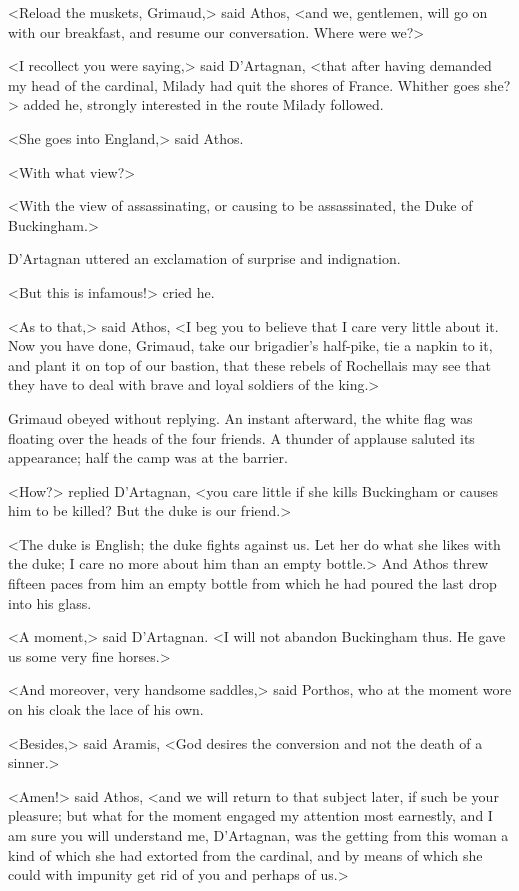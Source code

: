 <Reload the muskets, Grimaud,> said Athos, <and we, gentlemen, will go on with our breakfast, and resume our conversation. Where were we?> 

<I recollect you were saying,> said D'Artagnan, <that after having demanded my head of the cardinal, Milady had quit the shores of France. Whither goes she?> added he, strongly interested in the route Milady followed. 

<She goes into England,> said Athos. 

<With what view?> 

<With the view of assassinating, or causing to be assassinated, the Duke of Buckingham.> 

D'Artagnan uttered an exclamation of surprise and indignation. 

<But this is infamous!> cried he. 

<As to that,> said Athos, <I beg you to believe that I care very little about it. Now you have done, Grimaud, take our brigadier's half-pike, tie a napkin to it, and plant it on top of our bastion, that these rebels of Rochellais may see that they have to deal with brave and loyal soldiers of the king.> 

Grimaud obeyed without replying. An instant afterward, the white flag was floating over the heads of the four friends. A thunder of applause saluted its appearance; half the camp was at the barrier. 

<How?> replied D'Artagnan, <you care little if she kills Buckingham or causes him to be killed? But the duke is our friend.> 

<The duke is English; the duke fights against us. Let her do what she likes with the duke; I care no more about him than an empty bottle.> And Athos threw fifteen paces from him an empty bottle from which he had poured the last drop into his glass. 

<A moment,> said D'Artagnan. <I will not abandon Buckingham thus. He gave us some very fine horses.> 

<And moreover, very handsome saddles,> said Porthos, who at the moment wore on his cloak the lace of his own. 

<Besides,> said Aramis, <God desires the conversion and not the death of a sinner.> 

<Amen!> said Athos, <and we will return to that subject later, if such be your pleasure; but what for the moment engaged my attention most earnestly, and I am sure you will understand me, D'Artagnan, was the getting from this woman a kind of  which she had extorted from the cardinal, and by means of which she could with impunity get rid of you and perhaps of us.> 

